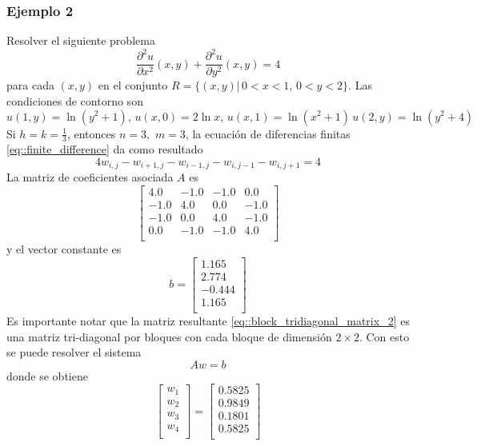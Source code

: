 \documentclass[a4paper]{article}
\begin{document}
\subsubsection{Ejemplo 2}
Resolver el siguiente problema 
\begin{equation}
\frac{\partial^2 u}{\partial x^2}(x,y)+\frac{\partial^2 u}{\partial y^2}(x,y)=4
\end{equation}
para cada $(x,y)$ en el conjunto $R=\{ (x,y)|\, 0<x<1,\, 0<y<2 \}$. Las condiciones de contorno  son 
\begin{equation*}
u(1,y)=\ln(y^2+1),\,u(x,0)=2\ln x,\, u(x,1)=\ln(x^2+1)\, u(2,y)=\ln(y^2+4)
\end{equation*}
Si $h=k=\frac{1}{3}$, entonces $n=3,\,\,m=3$, la ecuación de diferencias finitas \ref{eq::finite_difference} da como resultado
\begin{equation}
4w_{i,j}-w_{i+1,j}-w_{i-1,j}-w_{i,j-1}-w_{i,j+1}=4
\end{equation}
La matriz de coeficientes asociada $A$ es 
\begin{equation}\label{eq::block_tridiagonal_matrix_2}
\begin{bmatrix}
 4.0 & -1.0 &  -1.0 &  0.0\\
 -1.0 & 4.0 &  0.0 &  -1.0\\
 -1.0 & 0.0 &  4.0 &  -1.0\\
 0.0 & -1.0 &  -1.0 &  4.0\\    
\end{bmatrix}
\end{equation}
y el vector constante es 
\begin{equation*}
b =
\begin{bmatrix}
 1.165 \\
 2.774 \\
 -0.444 \\
 1.165 \\
\end{bmatrix}
\end{equation*}
Es importante notar que la matriz resultante \ref{eq::block_tridiagonal_matrix_2} es una matriz tri-diagonal por bloques con cada bloque de dimensión $2\times 2$. Con esto se puede resolver el sistema
\begin{equation}
Aw=b
\end{equation}
donde se obtiene
\begin{equation}
\begin{bmatrix}
w_1 \\
w_2 \\
w_3 \\
w_4 \\
\end{bmatrix}=
\begin{bmatrix}
  0.5825 \\
 0.9849 \\
 0.1801 \\
 0.5825 \\
\end{bmatrix}
\end{equation}
\end{document}

